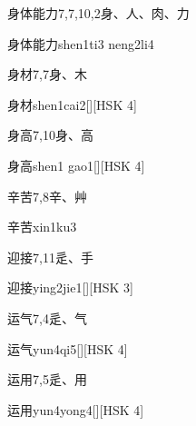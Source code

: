 \begin{entry}{身体能力}{7,7,10,2}{⾝、⼈、⾁、⼒}
  \begin{phonetics}{身体能力}{shen1ti3 neng2li4}
  \end{phonetics}
\end{entry}

\begin{entry}{身材}{7,7}{⾝、⽊}
  \begin{phonetics}{身材}{shen1cai2}[][HSK 4]
  \end{phonetics}
\end{entry}

\begin{entry}{身高}{7,10}{⾝、⾼}
  \begin{phonetics}{身高}{shen1 gao1}[][HSK 4]
  \end{phonetics}
\end{entry}

\begin{entry}{辛苦}{7,8}{⾟、⾋}
  \begin{phonetics}{辛苦}{xin1ku3}
  \end{phonetics}
\end{entry}

\begin{entry}{迎接}{7,11}{⾡、⼿}
  \begin{phonetics}{迎接}{ying2jie1}[][HSK 3]
  \end{phonetics}
\end{entry}

\begin{entry}{运气}{7,4}{⾡、⽓}
  \begin{phonetics}{运气}{yun4qi5}[][HSK 4]
  \end{phonetics}
\end{entry}

\begin{entry}{运用}{7,5}{⾡、⽤}
  \begin{phonetics}{运用}{yun4yong4}[][HSK 4]
  \end{phonetics}
\end{entry}

